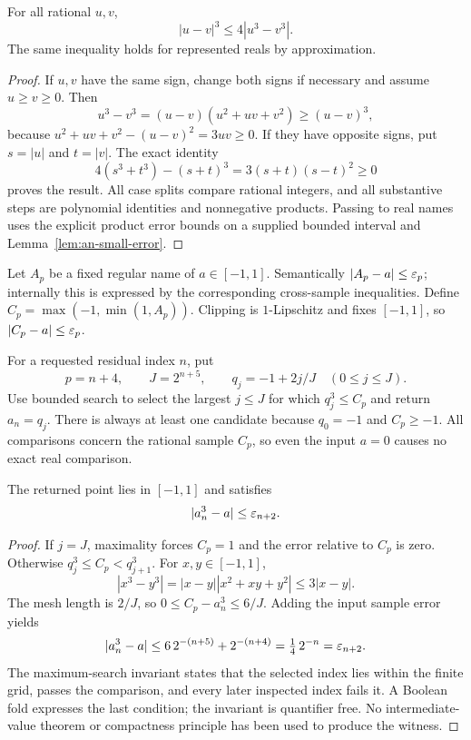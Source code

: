 \begin{lemma}
\label{lem:an-cubic-separation}
For all rational $u,v$,
\begin{equation}
 |u-v|^3\le4|u^3-v^3|.
 \label{eq:an-cubic-separation}
\end{equation}
The same inequality holds for represented reals by approximation.
\end{lemma}

\begin{proof}
If $u,v$ have the same sign, change both signs if necessary and assume
$u\ge v\ge0$.  Then
\[
 u^3-v^3=(u-v)(u^2+uv+v^2)\ge(u-v)^3,
\]
because $u^2+uv+v^2-(u-v)^2=3uv\ge0$.
If they have opposite signs, put $s=|u|$ and $t=|v|$.  The exact
identity
\[
 4(s^3+t^3)-(s+t)^3=3(s+t)(s-t)^2\ge0
\]
proves the result.  All case splits compare rational integers, and
all substantive steps are polynomial identities and nonnegative
products.  Passing to real names uses the explicit product error
bounds on a supplied bounded interval and
Lemma~\ref{lem:an-small-error}.
\end{proof}

Let $A_p$ be a fixed regular name of $a\in[-1,1]$.  Semantically
$|A_p-a|\le\varepsilon_p$; internally this is expressed by the
corresponding cross-sample inequalities.  Define
$C_p=\max(-1,\min(1,A_p))$.  Clipping is $1$-Lipschitz and fixes
$[-1,1]$, so $|C_p-a|\le\varepsilon_p$.

For a requested residual index $n$, put
\[
 p=n+4,\qquad J=2^{n+5},\qquad q_j=-1+2j/J\quad(0\le j\le J).
\]
Use bounded search to select the largest $j\le J$ for which
$q_j^3\le C_p$ and return $a_n=q_j$.  There is always at least one
candidate because $q_0=-1$ and $C_p\ge-1$.  All comparisons concern
the rational sample $C_p$, so even the input $a=0$ causes no exact
real comparison.

\begin{proposition}
\label{prop:an-cubic-approx}
The returned point lies in $[-1,1]$ and satisfies
\begin{equation}
 |a_n^3-a|\le\varepsilon_{n+2}.
 \label{eq:an-cubic-residual}
\end{equation}
\end{proposition}

\begin{proof}
If $j=J$, maximality forces $C_p=1$ and the error relative to
$C_p$ is zero.  Otherwise
$q_j^3\le C_p<q_{j+1}^3$.  For $x,y\in[-1,1]$,
\[
 |x^3-y^3|=|x-y||x^2+xy+y^2|\le3|x-y|.
\]
The mesh length is $2/J$, so
$0\le C_p-a_n^3\le6/J$.
Adding the input sample error yields
\[
 |a_n^3-a|\le6\,2^{-(n+5)}+2^{-(n+4)}
 =\tfrac14\,2^{-n}=\varepsilon_{n+2}.
\]
The maximum-search invariant states that the selected index lies
within the finite grid, passes the comparison, and every later
inspected index fails it.  A Boolean fold expresses the last condition;
the invariant is quantifier free.  No intermediate-value theorem or
compactness principle has been used to produce the witness.
\end{proof}

